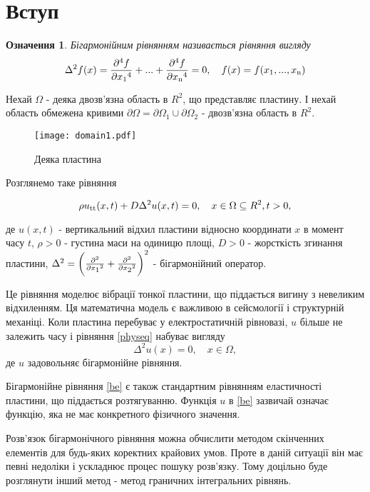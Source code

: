 \documentclass[12pt]{report}
\newtheorem{definition}{Означення}
\begin{document}
\tableofcontents

\chapter*{Вступ}
  
\begin{definition}
\label{be}
 	Бігармонійним рівнянням називається рівняння вигляду
  	$$
		\Delta^{2}f(x)=\frac{\partial^{4}f}{\partial x\textsubscript{1}^4}+...+\frac{\partial^{4}f}{\partial x\textsubscript{n}^4}=0,\quad f(x)=f(x\textsubscript{1},...,x\textsubscript{n})
	$$
\end{definition}

Нехай $\Omega$ - деяка двозв'язна область в $R^2$, що представляє пластину. І нехай область обмежена кривими $\partial\Omega=\partial\Omega_1\cup\partial\Omega_2$ - двозв'язна область в $R^2$. 

\begin{figure}[h!]
\centering
	\texttt{[image: domain1.pdf]}
	\caption{Деяка пластина }
\end{figure}

Розглянемо таке рівняння

\begin{equation} 
\label{physeq}
	\rho u\textsubscript{tt}(x,t)+D\Delta^{2} u(x,t)=0,
	\quad x\in \Omega\subseteq R^2,t>0,
\end{equation}

де $u(x,t)$ - вертикальний відхил пластини відносно координати $x$ в момент часу $t$, $\rho >0$ - густина маси на одиницю площі, $D >0$ - жорсткість згинання пластини, $\Delta^{2}=\bigg(\frac{\partial^{2}}{\partial x\textsubscript{1}^2}+\frac{\partial^{2}}{\partial x\textsubscript{2}^2}\bigg)^2$ - бігармонійний оператор.

Це рівняння моделює вібрації тонкої пластини, що піддається вигину з невеликим відхиленням. Ця математична модель є важливою в сейсмології і структурній механіці. 
Коли пластина перебуває у електростатичній рівновазі, $ u$ більше не залежить часу і рівняння \eqref{physeq} набуває вигляду
$$
	\Delta^{2}u(x)=0,\quad x\in\Omega,
$$
де $ u$ задовольняє бігармонійне рівняння.
 
 Бігармонійне рівняння \eqref{be} є також стандартним рівнянням еластичності пластини, що піддається розтягуванню. Функція $ u$ в \eqref{be} зазвичай означає функцію, яка не має конкретного фізичного значення.
 
Розв'язок бігармонічного рівняння можна обчислити методом скінченних елементів для будь-яких коректних крайових умов. Проте в даній ситуації він має певні недоліки і ускладнює процес пошуку розв'язку. Тому доцільно буде розглянути інший метод - метод граничних інтегральних рівнянь.
\end{document}
